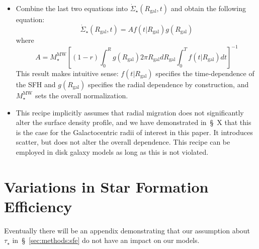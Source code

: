 \documentclass[a4paper, fleqn, usenatbib, useAMS]{mnras}
\begin{document}
\begin{appendices}
\begin{itemize}
	\item Combine the last two equations into 
	$\dot{\Sigma}_\star(R_\text{gal}, t)$ and obtain the following equation: 
	\begin{equation} 
	\dot{\Sigma}_\star(R_\text{gal}, t) = A f(t|R_\text{gal}) g(R_\text{gal}) 
	\end{equation} 
	where 
	\begin{equation} 
	A = M_\star^\text{MW}\left[(1 - r)\int_0^R g(R_\text{gal}) 2\pi R_\text{gal} 
	dR_\text{gal} \int_0^T f(t|R_\text{gal}) dt\right]^{-1} 
	\end{equation} 
	This result makes intuitive sense: $f(t|R_\text{gal})$ specifies the 
	time-dependence of the SFH and $g(R_\text{gal})$ specifies the radial 
	dependence by construction, and $M_\star^\text{MW}$ sets the overall 
	normalization. 

	\item This recipe implicitly assumes that radial migration does not 
	significantly alter the surface density profile, and we have demonstrated 
	in~\S~X that this is the case for the Galactocentric radii of interest in 
	this paper. It introduces scatter, but does not alter the overall 
	dependence. This recipe can be employed in disk galaxy models as long as 
	this is not violated. 
\end{itemize} 

\newpage 
\section{Variations in Star Formation Efficiency} 
\label{sec:sfe_variations} 
{\color{red} Eventually there will be an appendix demonstrating that our 
assumption about~$\tau_\star$ in~\S~\ref{sec:methods:sfe} do not have an 
impact on our models. }

\end{appendices} 

\newpage 
 
 

\label{lastpage} 
\end{document}
